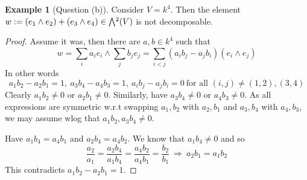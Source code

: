 \documentclass{scrartcl}
\newcommand{\extpow}{\mathchoice{{\textstyle\bigwedge}}
    {{\bigwedge}}
    {{\textstyle\wedge}}
    {{\scriptstyle\wedge}}}
\theoremstyle{definition}
\newtheorem{example}[subsection]{Example}
\begin{document}
\begin{example}[Question (b)]
    Consider $V = k^4$. 
    Then the element $w := (e_1 \wedge e_2) + (e_3 \wedge e_4) \in \extpow^2(V)$ is not decomposable. 
\end{example}
\begin{proof}
    Assume it was, then there are $a, b \in k^4$ such that
    \begin{equation*}
        w = \sum_i a_i e_i \wedge \sum_j b_j e_j = \sum_{i < j} (a_i b_j - a_j b_i) (e_i \wedge e_j)
    \end{equation*}
    In other words
    \begin{equation*}
        a_1b_2 - a_2b_1 = 1, \ a_3b_4 - a_4b_3 = 1, \ a_i b_j - a_j b_i = 0 \ \text{for all $(i, j) \neq (1, 2), (3, 4)$}
    \end{equation*}
    Clearly $a_1 b_2 \neq 0$ or $a_2 b_1 \neq 0$.
    Similarly, have $a_3 b_4 \neq 0$ or $a_4 b_3 \neq 0$.
    As all expressions are symmetric w.r.t swapping $a_1, b_2$ with $a_2, b_1$ and $a_3, b_4$ with $a_4, b_3$, we may assume wlog that $a_1 b_2, a_3 b_4 \neq 0$.

    Have $a_1 b_4 = a_4 b_1$ and $a_2 b_4 = a_4 b_2$.
    We know that $a_1 b_4 \neq 0$ and so
    \begin{equation*}
        \frac {a_2} {a_1} = \frac {a_2 b_4} {a_1 b_4} = \frac {a_4 b_2} {a_4 b_1} = \frac {b_2} {b_1} \ \Rightarrow \ a_2 b_1 = a_1 b_2
    \end{equation*}
    This contradicts $a_1 b_2 - a_2 b_1 = 1$.
\end{proof}
\end{document}
